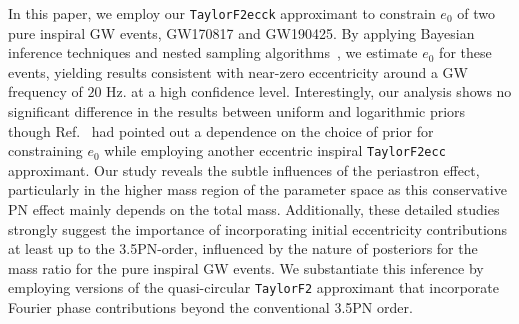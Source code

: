 \documentclass[aps,prd,twocolumn,superscriptaddress,groupedaddress,nofootinbib,showpacs,eqsecnum,useAms]{revtex4-2}
\begin{document}
In this paper, we employ our \texttt{TaylorF2ecck} approximant to constrain $e_0$ of two pure inspiral GW events, GW170817 and GW190425. By applying Bayesian inference techniques and nested sampling algorithms~\cite{Skilling2004}, we estimate $e_0$ for these events, yielding results consistent with near-zero eccentricity around a GW frequency of $20$ Hz.
at a high confidence level. 
Interestingly, our analysis shows no significant difference in the results between uniform and logarithmic priors though Ref.~\cite{LNB} had 
 pointed out a dependence on the choice of prior for constraining $e_0$ while 
employing another eccentric inspiral  \texttt{TaylorF2ecc} approximant.
Our study reveals the subtle influences of the periastron effect, particularly in the higher mass region of the parameter space as this conservative PN effect mainly depends on the total mass.
Additionally, these detailed studies strongly suggest 
the importance of incorporating initial eccentricity contributions at least up to the 3.5PN-order, influenced 
by the nature of posteriors for the mass ratio for the pure inspiral GW events.
We  substantiate this inference by employing versions of the quasi-circular 
\texttt{TaylorF2} approximant that incorporate Fourier phase contributions beyond the conventional 3.5PN order. 
\end{document}
